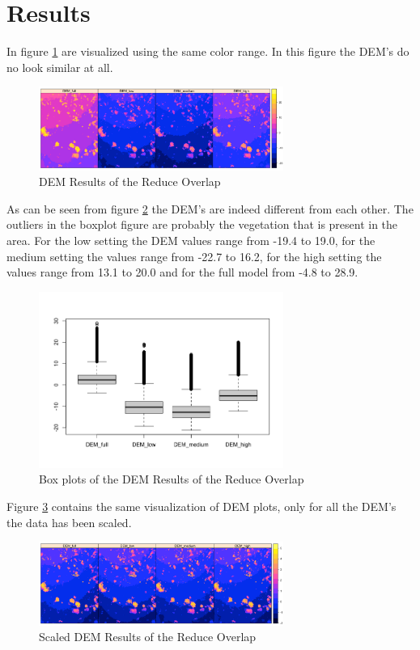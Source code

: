 \documentclass{isprs} %
\begin{document}
\section{Results}
In figure \ref{fig:DemPlot_unscaled} are visualized using the same color range. 
In this figure the DEM's do no look similar at all.


\begin{figure}[h]
    \centering
    \includegraphics[width=8cm]{DemPlots.png}
    \caption{DEM Results of the Reduce Overlap}
    \label{fig:DemPlot_unscaled}
\end{figure}

As can be seen from figure \ref{fig:BoxPlot_unscaled} the DEM's are indeed different from each other. 
The outliers in the boxplot figure are probably the vegetation that is present in the area.
For the low setting the DEM values range from -19.4 to 19.0, for the medium setting the values range from -22.7 to 16.2, for the high setting the values range from 13.1 to 20.0 and for the full model from -4.8 to 28.9.

\begin{figure}[h]
    \centering
    \includegraphics[width=8cm]{DemBoxplot.png}
    \caption{Box plots of the DEM Results of the Reduce Overlap}
    \label{fig:BoxPlot_unscaled}
\end{figure}

Figure \ref{fig:DemPlot_scaled} contains the same visualization of DEM plots, only for all the DEM's the data has been scaled.

\begin{figure}[h]
    \centering
    \includegraphics[width=8cm]{DemPlots_scaled.png}
    \caption{Scaled DEM Results of the Reduce Overlap}
    \label{fig:DemPlot_scaled}
\end{figure}
\end{document}

